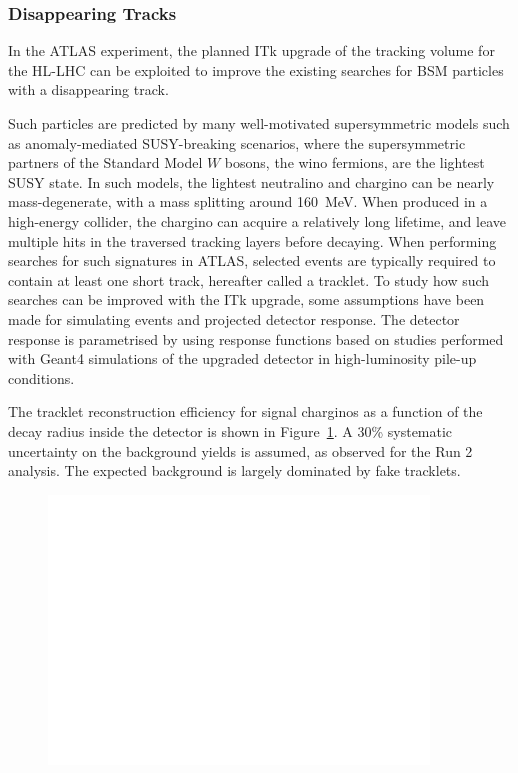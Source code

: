 \subsubsection{Disappearing Tracks}

In the ATLAS experiment, the planned ITk upgrade of the tracking volume for the HL-LHC can be exploited to improve the existing searches for BSM particles with a disappearing track.

Such particles are predicted by many well-motivated supersymmetric models such as anomaly-mediated SUSY-breaking scenarios, where the supersymmetric partners of the Standard Model $W$ bosons, the wino fermions, are the lightest SUSY state. In such models, the lightest neutralino and chargino can be nearly mass-degenerate, with a mass splitting around 160~MeV. When produced in a high-energy collider, the chargino can acquire a relatively long lifetime,%
and leave multiple hits in the traversed tracking layers before decaying. When performing searches for such signatures in ATLAS, selected events are typically required to contain at least one short track, hereafter called a tracklet. To study how such searches can be improved with the ITk upgrade, some assumptions have been made for simulating events and projected detector response. The detector response is parametrised by using response functions based on studies performed with Geant4 simulations of the upgraded detector in high-luminosity pile-up conditions.

The tracklet reconstruction efficiency for signal charginos as a function of the decay radius inside the detector is shown in Figure~\ref{fig:ATLAS_DT1}. A 30\% systematic uncertainty on the background yields is assumed, as observed for the Run 2 analysis. The expected background is largely dominated by fake tracklets. %
%
\begin{figure}[t]\begin{center}
\includegraphics[width=0.9\textwidth]{figures/ch03_fig_039.pdf}
\caption{ %
}
\label{fig:ATLAS_DT1}
\end{center}
\end{figure}

